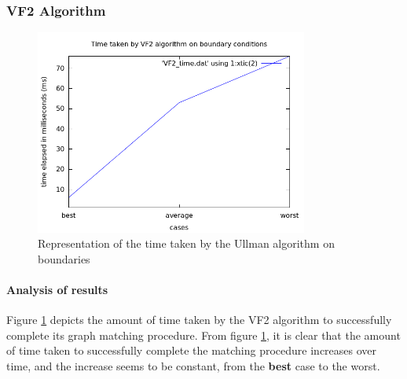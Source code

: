 \subsubsection{VF2 Algorithm}
\begin{figure}[H]
  \begin{center}
      \includegraphics[width=0.8\textwidth]{vf2_time.png}
  \end{center}    
  \caption{Representation of the time taken by the Ullman algorithm on boundaries}
  \label{fig:case_vf2_time}
\end{figure} 

\paragraph{Analysis of results}
Figure \ref{fig:case_vf2_time} depicts the amount of time taken by the VF2 algorithm to successfully complete its graph matching procedure.
From figure \ref{fig:case_vf2_time}, it is clear that the amount of time taken to successfully complete the matching procedure increases over time, and the 
increase seems to be constant, from the \textbf{best} case to the worst.

